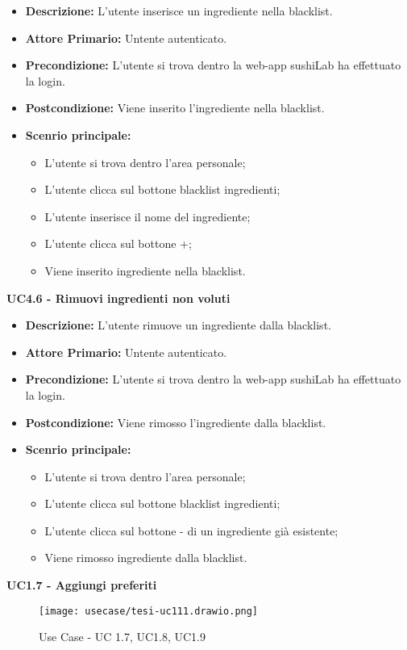 \begin{itemize}
    \item \textbf{Descrizione:} L'utente inserisce un ingrediente nella blacklist.
    \item \textbf{Attore Primario:} Untente autenticato.
    \item \textbf{Precondizione:} L'utente si trova dentro la web-app sushiLab  ha effettuato la login.
    \item \textbf{Postcondizione:} Viene inserito l'ingrediente nella blacklist.
    \item \textbf{Scenrio principale:}
    \begin{itemize}
        \item L'utente si trova dentro l'area personale;
        \item L'utente clicca sul bottone blacklist ingredienti;
        \item L'utente inserisce il nome del ingrediente;
        \item L'utente clicca sul bottone +;
        \item Viene inserito ingrediente nella blacklist.
    \end{itemize}
\end{itemize}
\textbf{UC4.6 - Rimuovi ingredienti non voluti}
\begin{itemize}
    \item \textbf{Descrizione:} L'utente rimuove un ingrediente dalla blacklist.
    \item \textbf{Attore Primario:} Untente autenticato.
    \item \textbf{Precondizione:} L'utente si trova dentro la web-app sushiLab  ha effettuato la login.
    \item \textbf{Postcondizione:} Viene rimosso l'ingrediente dalla blacklist.
    \item \textbf{Scenrio principale:}
    \begin{itemize}
        \item L'utente si trova dentro l'area personale;
        \item L'utente clicca sul bottone blacklist ingredienti;
        \item L'utente clicca sul bottone - di un ingrediente già esistente;
        \item Viene rimosso ingrediente dalla blacklist.
    \end{itemize}
\end{itemize}
\textbf{UC1.7 - Aggiungi preferiti}
\begin{figure}[H]
    \centering
    \texttt{[image: usecase/tesi-uc111.drawio.png]}
    \caption{Use Case - UC 1.7, UC1.8, UC1.9}
\end{figure}
